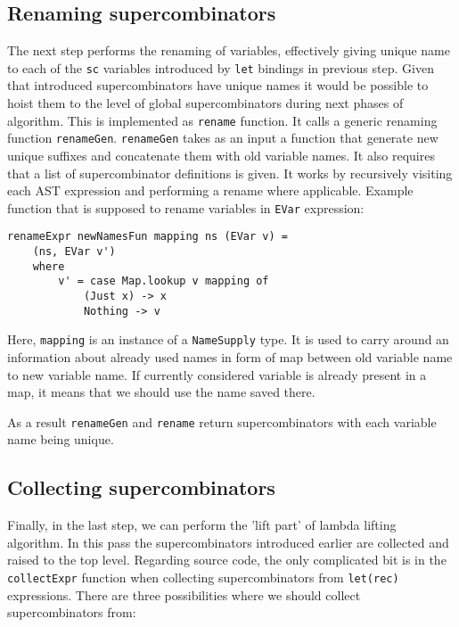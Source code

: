 \documentclass[12pt,a4paper]{report}
\begin{document}
\subsection{Renaming supercombinators}
The next step performs the renaming of variables, effectively giving unique
name to each of the \texttt{sc} variables introduced by \texttt{let} bindings
in previous step. Given that introduced supercombinators have unique names it
would be possible to hoist them to the level of global supercombinators during
next phases of algorithm. This is implemented as \texttt{rename} function. It
calls a generic renaming function \texttt{renameGen}. \texttt{renameGen} takes
as an input a function that generate new unique suffixes and concatenate them
with old variable names. It also requires that a list of supercombinator
definitions is given. It works by recursively visiting each AST expression and
performing a rename where applicable. Example function that is supposed to
rename variables in \texttt{EVar} expression:

\hspace*{-1.5in}
\begin{lstlisting}[style=haskell]
renameExpr newNamesFun mapping ns (EVar v) =
    (ns, EVar v')
    where
        v' = case Map.lookup v mapping of
            (Just x) -> x
            Nothing -> v
\end{lstlisting}

Here, \texttt{mapping} is an instance of a \texttt{NameSupply} type. It is used
to carry around an information about already used names in form of map between
old variable name to new variable name. If currently considered variable is
already present in a map, it means that we should use the name saved there.

As a result \texttt{renameGen} and \texttt{rename} return supercombinators with
each variable name being unique.

\subsection{Collecting supercombinators}
Finally, in the last step, we can perform the 'lift part' of lambda lifting
algorithm. In this pass the supercombinators introduced earlier are collected
and raised to the top level.  Regarding source code, the only complicated bit
is in the \texttt{collectExpr} function when collecting supercombinators from
\texttt{let(rec)} expressions.  There are three possibilities where we should
collect supercombinators from:
\end{document}
